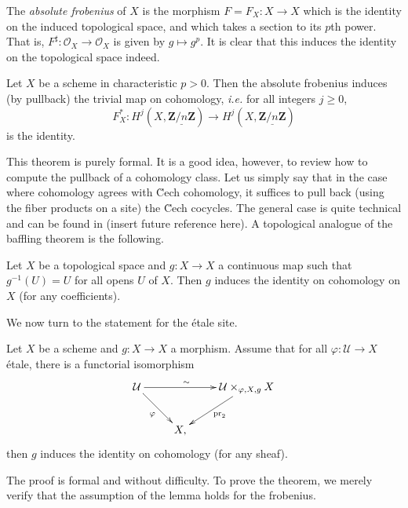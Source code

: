 \begin{definition}
The \emph{absolute frobenius} of $X$ is the morphism $F = F_X : X \to X$ which 
is the identity on the induced topological space, and which takes a section to 
its $p$th power. That is, $F^\sharp : \mathcal{O}_X \to \mathcal{O}_X$ is given 
by $g \mapsto g^p$. It is clear that this induces the identity on the 
topological space indeed.
\end{definition}

\begin{theorem} \label{thm:TheBafflingTheorem}
Let $X$ be a scheme in characteristic $p>0$. Then the absolute frobenius 
induces (by pullback) the trivial map on cohomology, {\it i.e.} for all 
integers $j\geq 0$,
$$
F_X^* : H^j (X, \underline{\mathbf{Z}/n\mathbf{Z}}) \longrightarrow  H^j (X, 
\underline{\mathbf{Z}/n\mathbf{Z}})
$$
is the identity.
\end{theorem}

This theorem is purely formal. It is a good idea, however, to review how to 
compute the pullback of a cohomology class. Let us simply say that in the case 
where cohomology agrees with \u Cech cohomology, it suffices to pull back 
(using the fiber products on a site) the \u Cech cocycles. The general case is 
quite technical and can be found in (insert future reference here). A 
topological analogue of the baffling theorem is the following.

\begin{exercise}
Let $X$ be a topological space and $g : X \to X$ a continuous map such that 
$g^{-1}(U) = U$ for all opens $U$ of $X$. Then $g$ induces the identity on 
cohomology on $X$ (for any coefficients).
\end{exercise}

We now turn to the statement for the \'etale site.

\begin{lemma} \label{lem:FormalStuffForBafflingThm}
Let $X$ be a scheme and $g : X \to X$ a morphism. Assume that for all $\varphi: 
\mathcal{U} \to X$ \'etale, there is a functorial isomorphism 
$$
\xymatrix{
\mathcal{U} \ar_{\varphi}[rd] \ar^{\sim \quad}[rr] &&  {\mathcal{U} 
\times_{\varphi, X,g} X} \ar^{\text{pr}_2}[ld]\\
& X,
}
$$
then $g$ induces the identity on cohomology (for any sheaf). 
\end{lemma}

The proof is formal and without difficulty. To prove the theorem, we merely 
verify that the assumption of the lemma holds for the frobenius.

